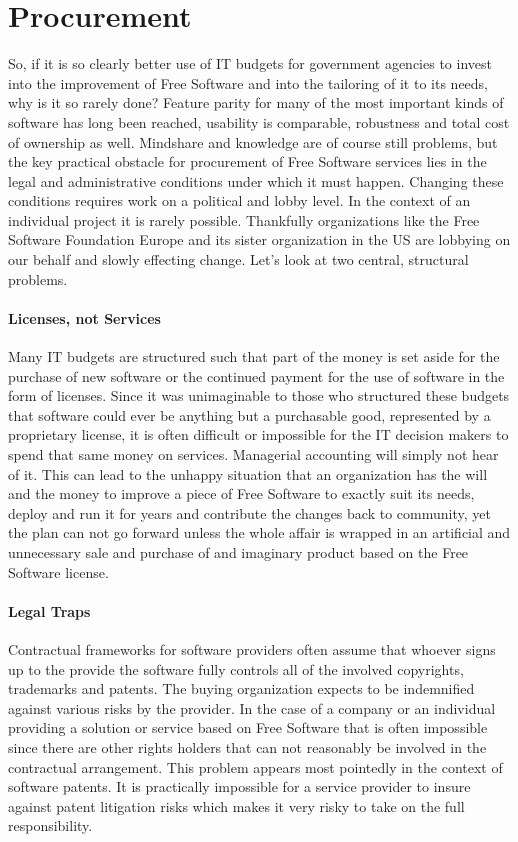 \section*{Procurement}

So, if it is so clearly better use of IT budgets for government agencies to invest
into the improvement of Free Software and into the tailoring of it to its needs, why is it
so rarely done? Feature parity for many of the most important kinds of software has
long been reached, usability is comparable, robustness and total cost of ownership
as well. Mindshare and knowledge are of course still problems, but the key practical obstacle
for procurement of Free Software services lies in the legal and administrative
conditions under which it must happen. Changing these conditions requires work
on a political and lobby level. In the context of an individual project it is
rarely possible. Thankfully organizations like the Free Software Foundation Europe and
its sister organization in the US are lobbying on our behalf and slowly effecting
change. Let's look at two central, structural problems.

\paragraph*{Licenses, not Services}

Many IT budgets are structured such that part of the money is set aside
for the purchase of new software or the continued payment for the use of software
in the form of licenses. Since it was unimaginable to those who structured these
budgets that software could ever be anything but a purchasable good, represented
by a proprietary license, it is often difficult or impossible for the IT decision
makers to spend that same money on services. Managerial accounting will simply not hear of it.
This can lead to the unhappy situation that an organization has the will and the
money to improve a piece of Free Software to exactly suit its needs, deploy and run
it for years and contribute the changes back to community, yet the plan can not
go forward unless the whole affair is wrapped in an artificial and unnecessary sale
and purchase of and imaginary product based on the Free Software license.

\paragraph*{Legal Traps}

Contractual frameworks for software providers often assume
that whoever signs up to the provide the software fully controls all of the involved 
copyrights, trademarks and patents. The buying organization expects to be indemnified against various
risks by the provider. In the case of a company or an individual providing a solution
or service based on Free Software that is often impossible since there are other
rights holders that can not reasonably be involved in the contractual arrangement.
This problem appears most pointedly in the context of software patents. It is practically
impossible for a service provider to insure against patent litigation risks which makes
it very risky to take on the full responsibility.

